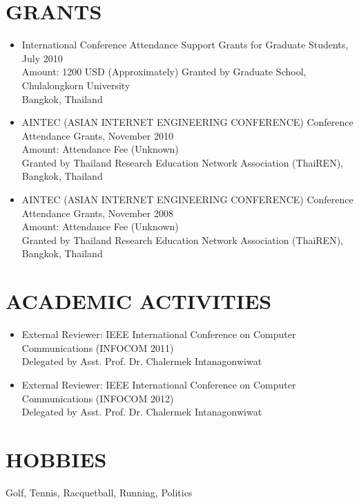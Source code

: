 \documentclass[margin]{res}
\begin{document}
\begin{resume}
\section{GRANTS}
 \begin{itemize}
					\item International Conference Attendance Support Grants for Graduate Students, July 2010 \\
						 Amount: 1200 USD (Approximately)
                		 Granted by Graduate School, Chulalongkorn University \\
                		 Bangkok, Thailand
                	\item AINTEC (ASIAN INTERNET ENGINEERING CONFERENCE) Conference Attendance Grants, November 2010 \\
                		 Amount: Attendance Fee (Unknown) \\
                		 Granted by Thailand Research Education Network Association (ThaiREN), Bangkok, Thailand
                	\item AINTEC (ASIAN INTERNET ENGINEERING CONFERENCE) Conference Attendance Grants, November 2008 \\
                		Amount: Attendance Fee (Unknown) \\
                		Granted by Thailand Research Education Network Association (ThaiREN), Bangkok, Thailand
\end{itemize} 
 
\section{ACADEMIC ACTIVITIES}
		\begin{itemize}
		\item External Reviewer: IEEE International Conference on Computer Communications (INFOCOM 2011) \\
		        Delegated by Asst. Prof. Dr. Chalermek Intanagonwiwat
		\item External Reviewer: IEEE International Conference on Computer Communications (INFOCOM 2012) \\
		 		Delegated by Asst. Prof. Dr. Chalermek Intanagonwiwat
		\end{itemize}
              
 
\section{HOBBIES}         Golf, Tennis, Racquetball, Running, Politics 
 
\end{resume} 
\end{document}
